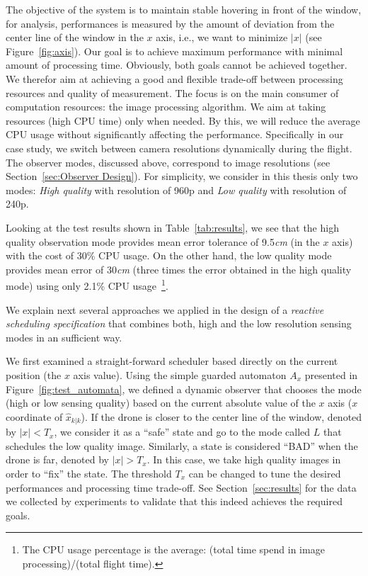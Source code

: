 \documentclass[ twoside, 12pt ]{article}
\begin{document}
The objective of the system is to maintain stable hovering in front of the window, for analysis, performances is measured by the amount of deviation from the center line of the window in the $x$ axis, i.e., we want to minimize $\left| x \right|$ (see Figure~\ref{fig:axis}).
Our goal is to achieve maximum performance with minimal amount of processing time.
Obviously, both goals cannot be achieved together. We therefor aim at achieving a good and flexible trade-off between processing resources and quality of measurement. The focus is on the main consumer of computation resources: the image processing algorithm.
We aim at taking resources (high CPU time) only when needed. By this, we will reduce the average CPU usage without significantly affecting the performance.
Specifically in our case study, we switch between camera resolutions dynamically during the flight. The observer modes, discussed above, correspond to image resolutions (see Section~\ref{sec:Observer Design}).
For simplicity, we consider in this thesis only two modes: \textit{High quality} with resolution of 960p and \textit{Low quality} with resolution of 240p.

Looking at the test results shown in Table~\ref{tab:results}, we see that the high quality observation mode provides mean error tolerance of 9.5\textit{cm} (in the $x$ axis) with the cost of 30\% CPU usage.
On the other hand, the low quality mode provides mean error of 30\textit{cm} (three times the error obtained in the high quality mode) using only 2.1\% CPU usage~\footnote{The CPU usage percentage is the average: (total time spend in image processing)/(total flight time). }.

We explain next several approaches we applied in the design of a \textit{reactive scheduling specification} that combines both, high and the low resolution sensing modes in an sufficient way.

We first examined a straight-forward scheduler based directly on the current position (the $x$ axis value). Using the simple guarded automaton $A_{x}$ presented in Figure~\ref{fig:test_automata}, we defined a dynamic observer that chooses the mode (high or low sensing quality) based on the current absolute value of the $x$ axis ($x$ coordinate of $\hat{x}_{k|k}$). If the drone is closer to the center line of the window, denoted by $|x| < T_x$, we consider it as a ``safe'' state and go to the mode called $L$ that schedules the low quality image.
Similarly, a state is considered ``BAD'' when the drone is far, denoted by $|x| > T_x$. In this case, we take high quality images in order to ``fix'' the state.
The threshold $T_x$ can be changed to tune the desired performances and processing time trade-off.
See Section~\ref{sec:results} for the data we collected by experiments to validate that this indeed achieves the required goals. 
\end{document}
